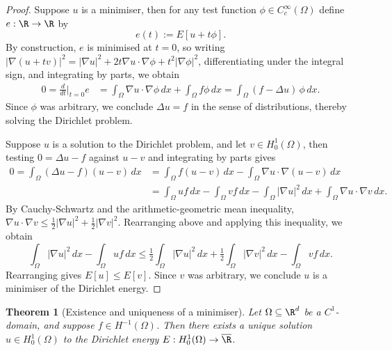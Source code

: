 \documentclass[reqno]{amsart}
\newtheorem{theorem}{Theorem}
\theoremstyle{definition}
\theoremstyle{remark}
\newcounter{problem}[section]	\declaretheorem[style=thmrecbox,name=Problem, numberlike=problem]{statement}
\begin{document}
\begin{proof}
	Suppose $u$ is a minimiser, then for any test function $\phi \in C^\infty_c (\Omega)$ define $e: \R \to \R$ by
		\[ e(t) := E[u + t\phi]. \]
	By construction, $e$ is minimised at $t = 0$, so writing $|\nabla (u + tv)|^2 = |\nabla u|^2 + 2t \nabla u \cdot \nabla \phi + t^2 |\nabla \phi|^2$, differentiating under the integral sign, and integrating by parts, we obtain 
		\begin{align*}
			0
				= \frac{d}{dt} \Big|_{t = 0} e 
				&= \int_\Omega \nabla u \cdot \nabla \phi \, dx + \int_\Omega f \phi\, dx = \int_\Omega (f- \Delta u) \, \phi \, dx.
		\end{align*}	
	Since $\phi$ was arbitrary, we conclude $\Delta u = f$ in the sense of distributions, thereby solving the Dirichlet problem. 
	
	Suppose $u$ is a solution to the Dirichlet problem, and let $v \in H^1_0 (\Omega)$, then testing $0 = \Delta u - f$ against $u - v$ and integrating by parts gives
		\begin{align*}
			 0 = \int_\Omega (\Delta u - f) (u - v) \, dx 
				&= \int_\Omega f ( u - v) \, dx - \int_\Omega \nabla u \cdot \nabla (u - v) \, dx \\
				&= \int_\Omega u f \, dx - \int_\Omega v f \, dx - \int_\Omega |\nabla u|^2 \, dx + \int_\Omega \nabla u \cdot \nabla v \, dx.
		\end{align*}		
	By Cauchy-Schwartz and the arithmetic-geometric mean inequality, $\nabla u \cdot \nabla v \leq \tfrac12 |\nabla u|^2 + \tfrac12 |\nabla v|^2$. Rearranging above and applying this inequality, we obtain
		\[ \int_\Omega |\nabla u|^2 \, dx - \int_\Omega uf \, dx \leq \tfrac12 \int_\Omega |\nabla u|^2 \, dx + \tfrac12 \int_\Omega |\nabla v|^2 \, dx - \int_\Omega v f \, dx.  \]	
	Rearranging gives $E[u] \leq E[v]$. Since $v$ was arbitrary, we conclude $u$ is a minimiser of the Dirichlet energy. 	
\end{proof}

\begin{theorem}[Existence and uniqueness of a minimiser]
	Let $\Omega \subseteq \R^d$ be a $C^1$-domain, and suppose $f \in H^{-1} (\Omega)$. Then there exists a unique solution $u \in H^1_0 (\Omega)$ to the Dirichlet energy $E: H^1_0(\Omega) \to \overline \R$. 
\end{theorem}
\end{document}
